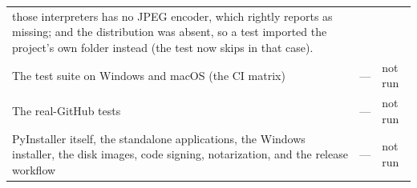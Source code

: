 \begin{table}[t]
\begin{tabularx}{\textwidth}{@{}L{60mm}L{50mm}Y@{}}
{{those interpreters has no JPEG encoder, which  rightly reports as missing; and the
 distribution was absent, so a test imported the project's own  folder
instead (the test now skips in that case).}} \\ \addlinespace[1.6pt]
\midrule
The test suite on Windows and macOS (the CI matrix) & --- & not run \\ \addlinespace[1.6pt]
The real-GitHub tests & --- & not run \\ \addlinespace[1.6pt]
PyInstaller itself, the standalone applications, the Windows installer, the disk images, code
signing, notarization, and the release workflow & --- & not run \\
\bottomrule
\end{tabularx}
\end{table}
